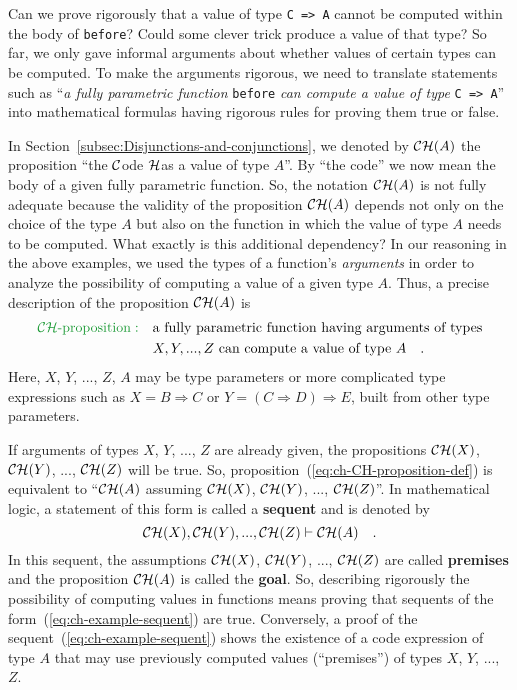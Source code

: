 Can we prove rigorously that a value of type \lstinline!C => A!
cannot be computed within the body of \lstinline!before!?
Could some clever trick produce a value of that type? So far, we only
gave informal arguments about whether values of certain types can
be computed. To make the arguments rigorous, we need to translate
statements such as ``\emph{a fully parametric function} \lstinline!before!
\emph{can compute a value of type} \lstinline!C => A!''
into mathematical formulas having rigorous rules for proving them
true or false.

In Section~\ref{subsec:Disjunctions-and-conjunctions}, we denoted
by ${\cal CH}(A)$ the proposition ``the ${\cal C}$ode ${\cal H}$as
a value of type $A$''. By ``the code'' we now mean the body of
a given fully parametric function. So, the notation ${\cal CH}(A)$
is not fully adequate because the validity of the proposition ${\cal CH}(A)$
depends not only on the choice of the type $A$ but also on the function
in which the value of type $A$ needs to be computed. What exactly
is this additional dependency? In our reasoning in the above examples,
we used the types of a function's \emph{arguments} in order to analyze
the possibility of computing a value of a given type $A$. Thus, a
precise description of the proposition ${\cal CH}(A)$ is 
\begin{align}
{\color{greenunder}{\cal CH}\text{-proposition}:}\quad & \text{a fully parametric function having arguments of types}\nonumber \\
 & X,Y,...,Z\text{ can compute a value of type }A\quad.\label{eq:ch-CH-proposition-def}
\end{align}
Here, $X$, $Y$, ..., $Z$, $A$ may be type parameters or more complicated
type expressions such as $X=B\Rightarrow C$ or $Y=(C\Rightarrow D)\Rightarrow E$,
built from other type parameters.

If arguments of types $X$, $Y$, ..., $Z$ are already given, the
propositions ${\cal CH}(X)$, ${\cal CH}(Y)$, ..., ${\cal CH}(Z)$
will be true. So, proposition~(\ref{eq:ch-CH-proposition-def}) is
equivalent to ``${\cal CH}(A)$ assuming ${\cal CH}(X)$, ${\cal CH}(Y)$,
..., ${\cal CH}(Z)$''. In mathematical logic, a statement of this
form is called a \textbf{sequent} and is denoted
by
\begin{equation}
{\cal CH}(X),{\cal CH}(Y),...,{\cal CH}(Z)\vdash{\cal CH}(A)\quad.\label{eq:ch-example-sequent}
\end{equation}
In this sequent, the assumptions ${\cal CH}(X)$, ${\cal CH}(Y)$,
..., ${\cal CH}(Z)$ are called \textbf{premises}
and the proposition ${\cal CH}(A)$ is called the \textbf{goal}.
So, describing rigorously the possibility of computing values in functions
means proving that sequents of the form~(\ref{eq:ch-example-sequent})
are true. Conversely, a proof of the sequent~(\ref{eq:ch-example-sequent})
shows the existence of a code expression of type $A$ that may use
previously computed values (``premises'') of types $X$, $Y$, ...,
$Z$.


